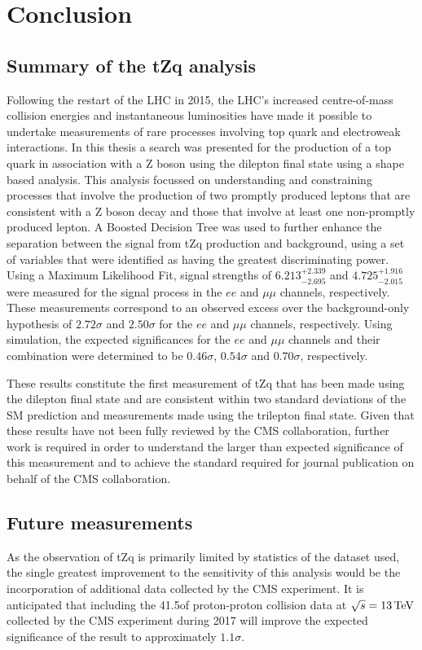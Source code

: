 \chapter{Conclusion}\label{chapter:conclusion}
\section{Summary of the tZq analysis}
Following the restart of the LHC in 2015, the LHC's increased centre-of-mass collision energies and instantaneous luminosities have made it possible to undertake measurements of rare processes involving top quark and electroweak interactions.
In this thesis a search was presented for the production of a top quark in association with a Z boson using the dilepton final state using a shape based analysis.
This analysis focussed on understanding and constraining processes that involve the production of two promptly produced leptons that are consistent with a Z boson decay and those that involve at least one non-promptly produced lepton.
A Boosted Decision Tree was used to further enhance the separation between the signal from tZq production and background, using a set of variables that were identified as having the greatest discriminating power.
Using a Maximum Likelihood Fit, signal strengths of $6.213_{-2.695}^{+2.339}$ and $4.725_{-2.015}^{+1.916}$ were measured for the signal process in the $ee$ and $\mu\mu$ channels, respectively.
These measurements correspond to an observed excess over the background-only hypothesis of $2.72\sigma$ and $2.50\sigma$ for the $ee$ and $\mu\mu$ channels, respectively.
Using simulation, the expected significances for the $ee$ and $\mu\mu$ channels and their combination were determined to be $0.46\sigma$, $0.54\sigma$ and $0.70\sigma$, respectively.

These results constitute the first measurement of tZq that has been made using the dilepton final state and are consistent within two standard deviations of the SM prediction and measurements made using the trilepton final state.
Given that these results have not been fully reviewed by the CMS collaboration, further work is required in order to understand the larger than expected significance of this measurement and to achieve the standard required for journal publication on behalf of the CMS collaboration.

\section{Future measurements}
As the observation of tZq is primarily limited by statistics of the dataset used, the single greatest improvement to the sensitivity of this analysis would be the incorporation of additional data collected by the CMS experiment.
It is anticipated that including the 41.5\fbinv of proton-proton collision data at $\sqrt{s} = 13\,\text{Te\hspace{-.08em}V}$ collected by the CMS experiment during 2017 will improve the expected significance of the result to approximately $1.1\sigma$.

